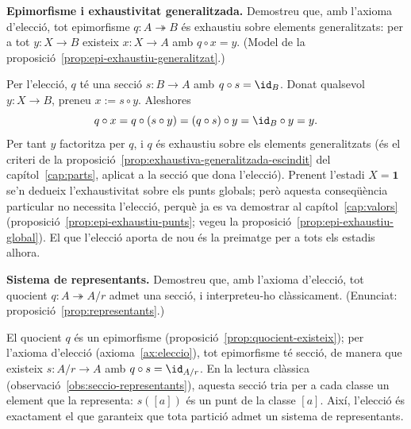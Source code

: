 \begin{exercici}
\textbf{Epimorfisme i exhaustivitat generalitzada.} Demostreu que, amb l'axioma d'elecció, tot epimorfisme \(q\colon A\twoheadrightarrow B\) és exhaustiu sobre elements generalitzats: per a tot \(y\colon X\to B\) existeix \(x\colon X\to A\) amb \(q\circ x=y\). (Model de la proposició~\ref{prop:epi-exhaustiu-generalitzat}.)
\end{exercici}
\begin{solucio}
Per l'elecció, \(q\) té una secció \(s\colon B\to A\) amb \(q\circ s=\id_B\). Donat qualsevol \(y\colon X\to B\), preneu \(x:=s\circ y\). Aleshores
\[
q\circ x=q\circ(s\circ y)=(q\circ s)\circ y=\id_B\circ y=y.
\]
Per tant \(y\) factoritza per \(q\), i \(q\) és exhaustiu sobre els elements generalitzats (és el criteri de la proposició~\ref{prop:exhaustiva-generalitzada-escindit} del capítol~\ref{cap:parts}, aplicat a la secció que dona l'elecció). Prenent l'estadi \(X=\mathbf1\) se'n dedueix l'exhaustivitat sobre els punts globals; però aquesta conseqüència particular no necessita l'elecció, perquè ja es va demostrar al capítol~\ref{cap:valors} (proposició~\ref{prop:epi-exhaustiu-punts}; vegeu la proposició~\ref{prop:epi-exhaustiu-global}). El que l'elecció aporta de nou és la preimatge per a tots els estadis alhora.
\end{solucio}

\begin{exercici}
\textbf{Sistema de representants.} Demostreu que, amb l'axioma d'elecció, tot quocient \(q\colon A\twoheadrightarrow A/r\) admet una secció, i interpreteu-ho clàssicament. (Enunciat: proposició~\ref{prop:representants}.)
\end{exercici}
\begin{solucio}
El quocient \(q\) és un epimorfisme (proposició~\ref{prop:quocient-existeix}); per l'axioma d'elecció (axioma~\ref{ax:eleccio}), tot epimorfisme té secció, de manera que existeix \(s\colon A/r\to A\) amb \(q\circ s=\id_{A/r}\). En la lectura clàssica (observació~\ref{obs:seccio-representants}), aquesta secció tria per a cada classe un element que la representa: \(s([a])\) és un punt de la classe \([a]\). Així, l'elecció és exactament el que garanteix que tota partició admet un sistema de representants.
\end{solucio}
